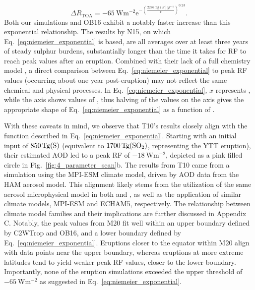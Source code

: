 \documentclass[draft]{agujournal2019}
\begin{document}
\begin{equation}
  \Delta
  R_{\mathrm{TOA}} =
  -\SI{65}{\watt\metre^{-2}}
  \mathrm{e}^{-{\left(\frac{\SI{2246}{\tera\gram(S)yr^{-1}}}{x}\right)}^{0.23}}.
  \label{eq:niemeier_exponential}
\end{equation}
%
Both our simulations and OB16 exhibit a notably faster increase than this exponential
relationship. The results by N15, on which Eq.~\ref{eq:niemeier_exponential} is based,
are all averages over at least three years of steady sulphur burdens, substantially
longer than the time it takes for RF to reach peak values after an eruption. Combined
with their lack of a full chemistry model \cite{niemeier2015}, a direct comparison
between Eq.~\ref{eq:niemeier_exponential} to peak RF values (occurring about one year
post-eruption) may not reflect the same chemical and physical processes. In
Eq.~\ref{eq:niemeier_exponential}, \(x\) represents , while the axis shows values
of , thus halving of the  values on the axis gives the appropriate shape
of Eq.~\ref{eq:niemeier_exponential} as a function of .

With these caveats in mind, we observe that T10's results closely align with the
function described in Eq.~\ref{eq:niemeier_exponential}. Starting with an initial input
of \(\SI{850}{\tera\gram(\ce{S})}\) (equivalent to \(\SI{1700}{\tera\gram(\ce{SO2})}\),
representing the YTT eruption), their estimated AOD led to a peak RF of
\(\SI{-18}{\watt\meter^{-2}}\), depicted as a pink filled circle in
Fig.~\ref{fig:4_parameter_scan}b. The results from T10 came from a simulation using the
MPI-ESM climate model, driven by AOD data from the HAM aerosol model. This alignment
likely stems from the utilization of the same aerosol microphysical model in both
 and , as well as the application of similar
climate models, MPI-ESM and ECHAM5, respectively. The relationship between climate model
families and their implications are further discussed in Appendix C. Notably, the peak
values from M20 fit well within an upper boundary defined by C2WTrop and OB16, and a
lower boundary defined by Eq.~\ref{eq:niemeier_exponential}. Eruptions closer to the
equator within M20 align with data points near the upper boundary, whereas eruptions at
more extreme latitudes tend to yield weaker peak RF values, closer to the lower
boundary. Importantly, none of the eruption simulations exceeded the upper threshold of
\(\SI{-65}{\watt\meter^{-2}}\) as suggested in Eq.~\ref{eq:niemeier_exponential}.
\end{document}
